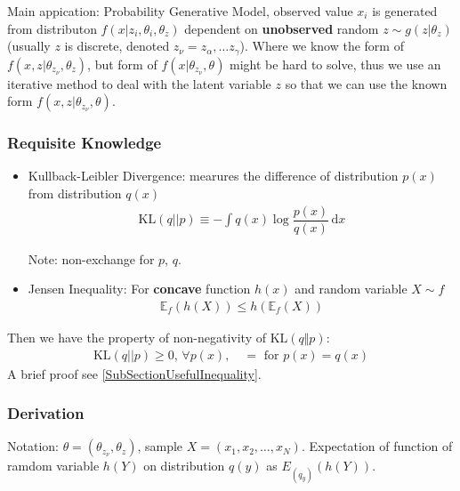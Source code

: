     Main appication: Probability Generative Model, observed value $ x_i $ is generated from distributon $ f(x|z_i,\theta _{i},\theta _z) $ dependent on \textbf{unobserved} random $ z\sim g(z|\theta _z) $(usually $ z $ is discrete, denoted $ z_\nu= z_\alpha ,\ldots z_\gamma  $). Where we know the form of $ f(x,z|\theta_{z_\nu},\theta_z) $, but form of $ f(x|\theta_{z_\nu},\theta) $ might be hard to solve, thus we use an iterative method to deal with the latent variable $ z $ so that we can use the known form $ f(x,z|\theta_{z_\nu},\theta) $.

\subsubsection{Requisite Knowledge}
    \begin{itemize}[topsep=2pt,itemsep=0pt]
        \item Kullback-Leibler Divergence: mearures the difference of distribution $ p(x) $ from distribution $ q(x) $
        \begin{align}
             \mathrm{KL}(q||p)\equiv -\int q(x)\log\dfrac{p(x)}{q(x)} \,\mathrm{d}x 
        \end{align}

        Note: non-exchange for $ p $, $ q $.
        \item Jensen Inequality: For \textbf{concave}  function $ h(x) $ and random variable $ X\sim f $
        \begin{align}
            \mathbb{E}_f\left(h(X)\right)\leq h\left(\mathbb{E}_f(X)\right) 
        \end{align}       
        
    \end{itemize}

    Then we have the property of non-negativity of $ \mathrm{KL}(q\Vert p)  $:
    \begin{align}
        \mathrm{KL}(q||p)\geq 0, \,\forall p(x),\quad = \text{ for }  p(x)=q(x) 
    \end{align}
    A brief proof see \autoref{SubSectionUsefulInequality}.
        
\subsubsection{Derivation}
    Notation: $ \theta=(\theta_{z_\nu},\theta_z) $, sample $ X=(x_{1},x_{2},\ldots,x_{N})  $. Expectation of function of ramdom variable $ h(Y) $ on distribution $ q(y) $ as $ E_{(q_y)}\left(h(Y)\right) $.


